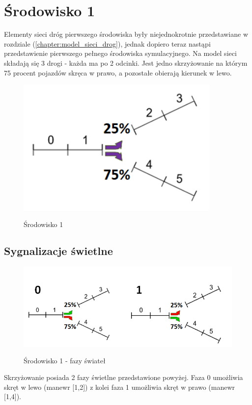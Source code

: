 \documentclass[12pt]{book}
\theoremstyle{plain}
\newcommand{\myref}[1]{(\ref{#1})}
\begin{document}
\section{Środowisko 1}
Elementy sieci dróg pierwszego środowiska były niejednokrotnie przedstawiane w rozdziale \myref{chapter:model_sieci_drog}, jednak dopiero teraz nastąpi przedstawienie pierwszego pełnego środowiska symulacyjnego. Na model sieci składają się 3 drogi - każda ma po 2 odcinki. Jest jedno skrzyżowanie na którym 75 procent pojazdów skręca w prawo, a pozostałe obierają kierunek w lewo.
\begin{figure}[H]
	\centering
	\includegraphics[width=10cm]{images/env_11_procenty}
	\label{fig:env_11}
	\caption{Środowisko 1}
\end{figure}

\subsection{Sygnalizacje świetlne}	
\begin{figure}[H]
	\centering
	\includegraphics[width=17cm]{images/env_11_fazy_procenty_no_yellow}
	\label{fig:env_11_fazy}
	\caption{Środowisko 1 - fazy świateł}
\end{figure}\noindent
Skrzyżowanie posiada 2 fazy świetlne przedstawione powyżej. Faza 0 umożliwia skręt w lewo (manewr [1,2]) z kolei faza 1 umożliwia skręt w prawo (manewr [1,4]).
\end{document}
